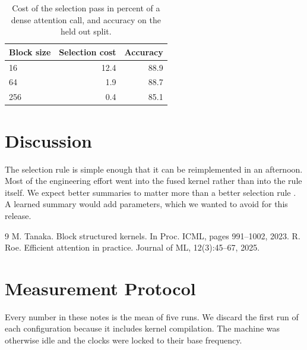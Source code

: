 \documentclass[11pt,a4paper]{article}
\newcommand{\s}[1]{#1}
\begin{document}
\begin{table}[t]
  \centering
  \begin{tabular}{lrr}
    \toprule
    Block size & Selection cost & Accuracy \\
    \midrule
    16 & 12.4 & 88.9 \\
    64 & 1.9 & 88.7 \\
    256 & 0.4 & 85.1 \\
    \bottomrule
  \end{tabular}
  \caption{Cost of the selection pass in percent of a dense attention call, and accuracy on the held out split.}
  \label{tab:block}
\end{table}

\section{Discussion}

\s{The selection rule is simple enough that it can be reimplemented in an afternoon.}
\s{Most of the engineering effort went into the fused kernel rather than into the rule itself.}
\s{We expect better summaries to matter more than a better selection rule \cite{tanaka2023blocks}.}
\s{A learned summary would add parameters, which we wanted to avoid for this release.}

\begin{thebibliography}{9}
M. Tanaka. Block structured kernels. In Proc. ICML, pages 991--1002, 2023.
R. Roe. Efficient attention in practice. Journal of ML, 12(3):45--67, 2025.
\end{thebibliography}

\appendix

\section{Measurement Protocol}

\s{Every number in these notes is the mean of five runs.}
\s{We discard the first run of each configuration because it includes kernel compilation.}
\s{The machine was otherwise idle and the clocks were locked to their base frequency.}
\end{document}
